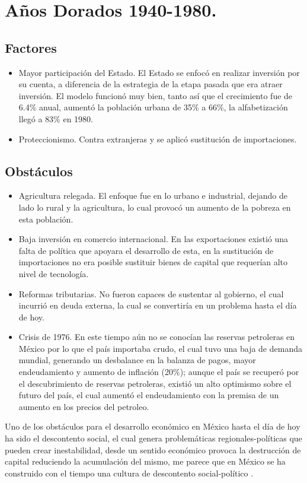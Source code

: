\section{Años Dorados 1940-1980.}
\subsection{Factores}
\begin{itemize}
    \item Mayor participación del Estado. El Estado se enfocó en realizar inversión por su cuenta, a diferencia de la estrategia de la etapa pasada que era atraer inversión. El modelo funcionó muy bien, tanto así que el crecimiento fue de 6.4\% anual, aumentó la población urbana de 35\% a 66\%, la alfabetización llegó a 83\% en 1980.
    \item Proteccionismo. Contra extranjeras y se aplicó sustitución de importaciones.
\end{itemize}

\subsection{Obstáculos}
\begin{itemize}
    \item Agricultura relegada. El enfoque fue en lo urbano e industrial, dejando de lado lo rural y la agricultura, lo cual provocó un aumento de la pobreza en esta población.
    \item Baja inversión en comercio internacional. En las exportaciones existió una falta de política que apoyara el desarrollo de esta, en la sustitución de importaciones no era posible sustituir bienes de capital que requerían alto nivel de tecnología.
    \item Reformas tributarias. No fueron capaces de sustentar al gobierno, el cual incurrió en deuda externa, la cual se convertiría en un problema hasta el día de hoy.
    \item Crisis de 1976. En este tiempo aún no se conocían las reservas petroleras en México por lo que el país importaba crudo, el cual tuvo una baja de demanda mundial, generando un desbalance en la balanza de pagos, mayor endeudamiento y aumento de inflación (20\%); aunque el país se recuperó por el descubrimiento de reservas petroleras, existió un alto optimismo sobre el futuro del país, el cual aumentó el endeudamiento con la premisa de un aumento en los precios del petroleo.
\end{itemize}


Uno de los obstáculos para el desarrollo económico en México hasta el día de hoy ha sido el descontento social, el cual genera problemáticas regionales-políticas que pueden crear inestabilidad, desde un sentido económico provoca la destrucción de capital reduciendo la acumulación del mismo, me parece que en México se ha construido con el tiempo una cultura de descontento social-político \cite{ReformasHistoria}.